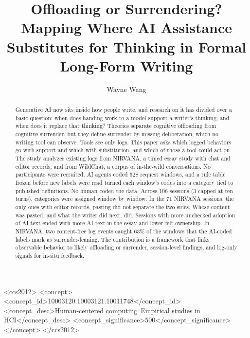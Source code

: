 \documentclass[manuscript,screen]{acmart}
\begin{document}
\title[Offloading or Surrendering?]{Offloading or Surrendering? Mapping Where AI Assistance Substitutes for Thinking in Formal Long-Form Writing}

\author{Wayne Wang}

\begin{abstract}
Generative AI now sits inside how people write, and research on it has divided over a basic question: when does handing work to a model support a writer's thinking, and when does it replace that thinking? Theories separate cognitive offloading from cognitive surrender, but they define surrender by missing deliberation, which no writing tool can observe. Tools see only logs. This paper asks which logged behaviors go with support and which with substitution, and which of those a tool could act on. The study analyzes existing logs from NIRVANA, a timed essay study with chat and editor records, and from WildChat, a corpus of in-the-wild conversations. No participants were recruited. AI agents coded 528 request windows, and a rule table frozen before new labels were read turned each window's codes into a category tied to published definitions. No human coded the data. Across 106 sessions (3 capped at ten turns), categories were assigned window by window. In the 71 NIRVANA sessions, the only ones with editor records, pasting did not separate the two sides. Whose content was pasted, and what the writer did next, did. Sessions with more unchecked adoption of AI text ended with more AI text in the essay and lower felt ownership. In NIRVANA, two content-free log events caught 63\% of the windows that the AI-coded labels mark as surrender-leaning. The contribution is a framework that links observable behavior to likely offloading or surrender, session-level findings, and log-only signals for in-situ feedback.
\end{abstract}

\begin{CCSXML}
<ccs2012>
   <concept>
       <concept_id>10003120.10003121.10011748</concept_id>
       <concept_desc>Human-centered computing~Empirical studies in HCI</concept_desc>
       <concept_significance>500</concept_significance>
   </concept>
 </ccs2012>
\end{CCSXML}
\end{document}
